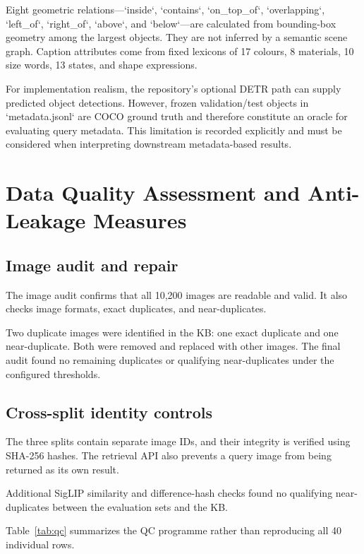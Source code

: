 \documentclass{article}
\begin{document}
Eight geometric relations---`inside`, `contains`, `on\_top\_of`,
`overlapping`, `left\_of`, `right\_of`, `above`, and `below`---are
calculated from bounding-box geometry among the largest objects. They
are not inferred by a semantic scene graph. Caption attributes come from
fixed lexicons of 17 colours, 8 materials, 10 size words, 13 states, and
shape expressions.

For implementation realism, the repository's optional DETR path can
supply predicted object detections. However, frozen validation/test
objects in `metadata.jsonl` are COCO ground truth and therefore
constitute an oracle for evaluating query metadata. This limitation is
recorded explicitly and must be considered when interpreting downstream
metadata-based results.

\section{Data Quality Assessment and Anti-Leakage
Measures}\label{data-quality-assessment-and-anti-leakage-measures}

\subsection{Image audit and repair}\label{image-audit-and-repair}

The image audit confirms that all 10,200 images are readable and
valid. It also checks image formats, exact duplicates, and
near-duplicates.

Two duplicate images were identified in the KB: one exact duplicate
and one near-duplicate. Both were removed and replaced with other
images. The final audit found no remaining duplicates or qualifying
near-duplicates under the configured thresholds.

\subsection{Cross-split identity
controls}\label{cross-split-identity-controls}

The three splits contain separate image IDs, and their integrity is
verified using SHA-256 hashes. The retrieval API also prevents a
query image from being returned as its own result.

Additional SigLIP similarity and difference-hash checks found no
qualifying near-duplicates between the evaluation sets and the KB.

Table~\ref{tab:qc} summarizes the QC programme rather than
reproducing all 40 individual rows.
\end{document}

